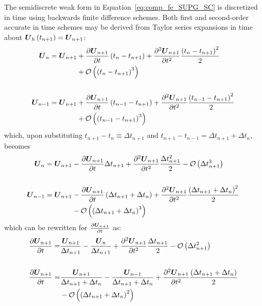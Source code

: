 The semidiscrete weak form in Equation~\eqref{eq:comp_fe_SUPG_SC} is discretized in time using backwards finite difference schemes.  Both first and second-order accurate in time schemes may be derived from Taylor series expansions in time about ${\boldsymbol{U}}_h\left(t_{n+1}\right)={\boldsymbol{U}}_{n+1}$:
\begin{align}
  {\boldsymbol{U}}_n     = {\boldsymbol{U}}_{n+1} &+ {\frac{\partial{{\boldsymbol{U}}_{n+1}}}{\partial{t}}}\left(t_n-t_{n+1}\right) + {\frac{{\partial}^2{{\boldsymbol{U}}_{n+1}}}{\partial{t}^2}}\frac{\left(t_n-t_{n+1}\right)^2}{2} \nonumber \\
                              &+ \mathcal{O}\left(\left(t_n-t_{n+1}\right)^3\right) \nonumber \\
                              & \nonumber \\
  {\boldsymbol{U}}_{n-1} = {\boldsymbol{U}}_{n+1} &+ {\frac{\partial{{\boldsymbol{U}}_{n+1}}}{\partial{t}}}\left(t_{n-1}-t_{n+1}\right) + {\frac{{\partial}^2{{\boldsymbol{U}}_{n+1}}}{\partial{t}^2}}\frac{\left(t_{n-1}-t_{n+1}\right)^2}{2} \nonumber \\
                              &+ \mathcal{O}\left(\left(t_{n-1}-t_{n+1}\right)^3\right) \nonumber
\end{align}
which, upon substituting $t_{n+1} - t_n\equiv\Delta t_{n+1}$ and $t_{n+1} - t_{n-1}=\Delta t_{n+1} + \Delta t_n$, becomes
\begin{align}
  {\boldsymbol{U}}_n     = {\boldsymbol{U}}_{n+1} &- {\frac{\partial{{\boldsymbol{U}}_{n+1}}}{\partial{t}}}\Delta t_{n+1} + {\frac{{\partial}^2{{\boldsymbol{U}}_{n+1}}}{\partial{t}^2}}\frac{\Delta t_{n+1}^2}{2} - \mathcal{O}\left(\Delta t_{n+1}^3\right) \nonumber \\ 
                              & \nonumber \\
  {\boldsymbol{U}}_{n-1} = {\boldsymbol{U}}_{n+1} &- {\frac{\partial{{\boldsymbol{U}}_{n+1}}}{\partial{t}}}\left(\Delta t_{n+1}+\Delta t_n\right) + {\frac{{\partial}^2{{\boldsymbol{U}}_{n+1}}}{\partial{t}^2}}\frac{\left(\Delta t_{n+1}+\Delta t_n\right)^2}{2} \nonumber \\
                              &- \mathcal{O}\left(\left(\Delta t_{n+1}+\Delta t_n\right)^3\right) \nonumber
\end{align}
which can be rewritten for ${\frac{\partial{{\boldsymbol{U}}_{n+1}}}{\partial{t}}}$ as:
\begin{align}
  {\frac{\partial{{\boldsymbol{U}}_{n+1}}}{\partial{t}}} = &\frac{{\boldsymbol{U}}_{n+1}}{\Delta t_{n+1}} - \frac{{\boldsymbol{U}}_n}{\Delta t_{n+1}} + {\frac{{\partial}^2{{\boldsymbol{U}}_{n+1}}}{\partial{t}^2}} \frac{\Delta t_{n+1}}{2}
                          - \mathcal{O}\left(\Delta t_{n+1}^2\right) \label{eq:udot,un} \\
                              & \nonumber \\
  {\frac{\partial{{\boldsymbol{U}}_{n+1}}}{\partial{t}}} = &\frac{{\boldsymbol{U}}_{n+1}}{\Delta t_{n+1} + \Delta t_n} - \frac{{\boldsymbol{U}}_{n-1}}{\Delta t_{n+1} + \Delta t_n} + {\frac{{\partial}^2{{\boldsymbol{U}}_{n+1}}}{\partial{t}^2}}\frac{\left(\Delta t_{n+1} + \Delta t_n\right)}{2} \nonumber \\
                          &- \mathcal{O}\left(\left(\Delta t_{n+1} + \Delta t_n\right)^2\right) \label{eq:udot,unm1}
\end{align}


